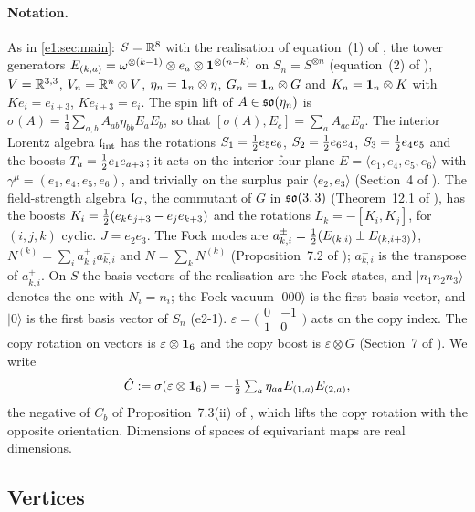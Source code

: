\paragraph{Notation.} As in \cref{e1:sec:main}: $S=\mathbb{R}^8$ with the realisation of equation~(1) of \cite{ES17}, the tower generators
$E_{(k,a)}=\omega^{\otimes(k-1)}\otimes e_a\otimes\mathbf 1^{\otimes(n-k)}$ on $S_n=S^{\otimes n}$ (equation~(2) of \cite{ES17}), $V=\mathbb{R}^{3,3}$,
$V_n=\mathbb{R}^n\otimes V$, $\eta_n=\mathbf 1_n\otimes\eta$, $G_n=\mathbf 1_n\otimes G$ and $K_n=\mathbf 1_n\otimes K$ with $Ke_i=e_{i+3}$, $Ke_{i+3}=e_i$. The spin lift of
$A\in\mathfrak{so}(\eta_n)$ is $\sigma(A)=\tfrac14\sum_{a,b}A_{ab}\eta_{bb}E_aE_b$, so that $[\sigma(A),E_c]=\sum_aA_{ac}E_a$. The interior Lorentz algebra
$\mathfrak l_{\rm int}$ has the rotations $S_1=\tfrac12 e_5e_6$, $S_2=\tfrac12 e_6e_4$, $S_3=\tfrac12 e_4e_5$ and the boosts $T_a=\tfrac12 e_1e_{a+3}$; it acts on the
interior four-plane $E=\langle e_1,e_4,e_5,e_6\rangle$ with $\gamma^\mu=(e_1,e_4,e_5,e_6)$, and trivially on the surplus pair $\langle e_2,e_3\rangle$
(Section~4 of \cite{ES17}). The field-strength algebra $\mathfrak l_G$, the commutant of $G$ in $\mathfrak{so}(3,3)$ (Theorem~12.1 of \cite{ES17}), has the boosts
$K_i=\tfrac12(e_ke_{j+3}-e_je_{k+3})$ and the rotations $L_k=-[K_i,K_j]$, for $(i,j,k)$ cyclic. $J=e_2e_3$. The Fock modes are
$a^\pm_{k,i}=\tfrac12(E_{(k,i)}\pm E_{(k,i+3)})$, $N^{(k)}=\sum_ia^+_{k,i}a^-_{k,i}$ and $N=\sum_kN^{(k)}$ (Proposition~7.2 of \cite{RE}); $a^-_{k,i}$ is the
transpose of $a^+_{k,i}$. On $S$ the basis vectors of the realisation are the Fock states, and $|n_1n_2n_3\rangle$ denotes the one with
$N_i=n_i$; the Fock vacuum $|000\rangle$ is the first basis vector, and $|0\rangle$ is the first basis vector of $S_n$ (e2-1). $\varepsilon=\bigl(\begin{smallmatrix}0&-1\\1&0\end{smallmatrix}\bigr)$
acts on the copy index. The copy rotation on vectors is $\varepsilon\otimes\mathbf 1_6$ and the copy boost is $\varepsilon\otimes G$ (Section~7 of
\cite{RE}). We write
\[
\hat C:=\sigma(\varepsilon\otimes\mathbf 1_6)=-\tfrac12\textstyle\sum_a\eta_{aa}E_{(1,a)}E_{(2,a)} ,
\]
the negative of $C_b$ of Proposition~7.3(ii) of \cite{RE}, which lifts the copy rotation with the opposite orientation. Dimensions of
spaces of equivariant maps are real dimensions.

\subsection{Vertices}
\label{e2:sec:vertex}

